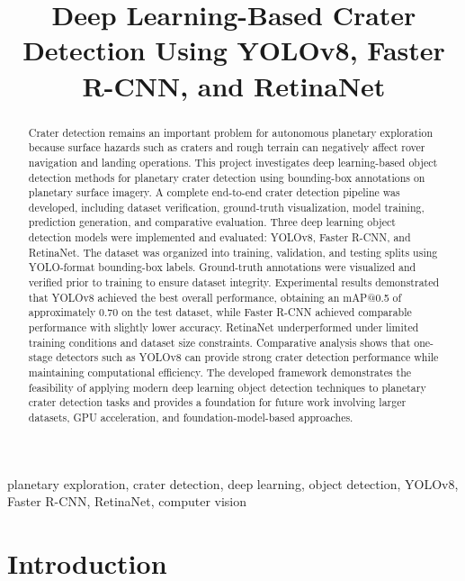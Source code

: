 \documentclass[conference]{IEEEtran}
\title{
	Deep Learning-Based Crater Detection Using YOLOv8,
	Faster R-CNN, and RetinaNet
}
\author{
	\IEEEauthorblockN{Scott Nguyen}
	\IEEEauthorblockA{
		Department of Electrical and Computer Engineering \\
		University of New Mexico \\
		Albuquerque, New Mexico, USA \\
		snguyen9@unm.edu
	}
}
\begin{document}
	
	\maketitle
	
	\begin{abstract}
		
		Crater detection remains an important problem for autonomous planetary exploration because surface hazards such as craters and rough terrain can negatively affect rover navigation and landing operations. This project investigates deep learning-based object detection methods for planetary crater detection using bounding-box annotations on planetary surface imagery. A complete end-to-end crater detection pipeline was developed, including dataset verification, ground-truth visualization, model training, prediction generation, and comparative evaluation. Three deep learning object detection models were implemented and evaluated: YOLOv8, Faster R-CNN, and RetinaNet. The dataset was organized into training, validation, and testing splits using YOLO-format bounding-box labels. Ground-truth annotations were visualized and verified prior to training to ensure dataset integrity. Experimental results demonstrated that YOLOv8 achieved the best overall performance, obtaining an mAP@0.5 of approximately 0.70 on the test dataset, while Faster R-CNN achieved comparable performance with slightly lower accuracy. RetinaNet underperformed under limited training conditions and dataset size constraints. Comparative analysis shows that one-stage detectors such as YOLOv8 can provide strong crater detection performance while maintaining computational efficiency. The developed framework demonstrates the feasibility of applying modern deep learning object detection techniques to planetary crater detection tasks and provides a foundation for future work involving larger datasets, GPU acceleration, and foundation-model-based approaches.
		
	\end{abstract}
	
	\begin{IEEEkeywords}
		planetary exploration, crater detection, deep learning, object detection, YOLOv8, Faster R-CNN, RetinaNet, computer vision
	\end{IEEEkeywords}
	
	\section{Introduction}
	
\end{document}
